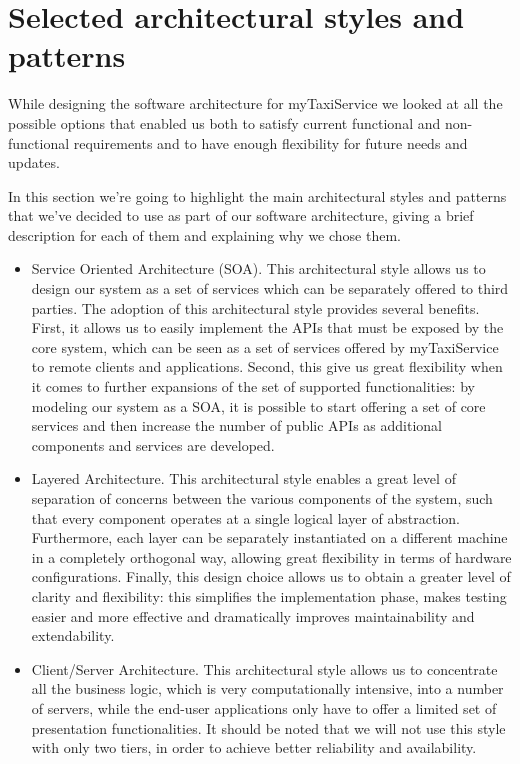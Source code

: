 \section{Selected architectural styles and patterns}
While designing the software architecture for myTaxiService we looked at all the possible options that enabled us both to satisfy current functional and non-functional requirements and to have enough flexibility for future needs and updates.

In this section we're going to highlight the main architectural styles and patterns that we've decided to use as part of our software architecture, giving a brief description for each of them and explaining why we chose them.

\begin{itemize}
	\item Service Oriented Architecture (SOA). This architectural style allows us to design our system as a set of services which can be separately offered to third parties. The adoption of this architectural style provides several benefits. First, it allows us to easily implement the APIs that must be exposed by the core system, which can be seen as a set of services offered by myTaxiService to remote clients and applications. Second, this give us great flexibility when it comes to further expansions of the set of supported functionalities: by modeling our system as a SOA, it is possible to start offering a set of core services and then increase the number of public APIs as additional components and services are developed. 
	\item Layered Architecture. This architectural style enables a great level of separation of concerns between the various components of the system, such that every component operates at a single logical layer of abstraction. Furthermore, each layer can be separately instantiated on a different machine in a completely orthogonal way, allowing great flexibility in terms of hardware configurations. Finally, this design choice allows us to obtain a greater level of clarity and flexibility: this simplifies the implementation phase, makes testing easier and more effective and dramatically improves maintainability and extendability.
	\item Client/Server Architecture. This architectural style allows us to concentrate all the business logic, which is very computationally intensive, into a number of servers, while the end-user applications only have to offer a limited set of presentation functionalities. It should be noted that we will not use this style with only two tiers, in order to achieve better reliability and availability.

\end{itemize}
